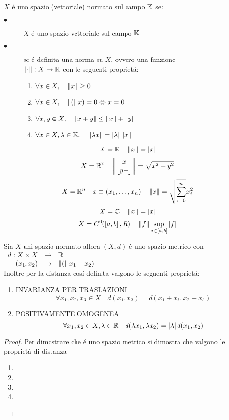 $X$ \'e uno spazio (vettoriale) normato sul campo $\mathbb{K}$ se:
\begin{description}
	\item[$\bullet$] $X$ \'e uno spazio vettoriale sul campo $\mathbb{K}$
	\item[$\bullet$] se \'e definita una norma su $X$, ovvero una funzione\\
	$\left\| \cdot \right\|:X\to\mathbb{R}$ con le seguenti propriet\'a:
	\begin{enumerate}
		\item $\forall x\in X,\quad\left\|x\right\|\ge0$
		\item $\forall x\in X,\quad\left\|(\right\|x)=0\Leftrightarrow x=0$
		\item $\forall x,y\in X,\quad\left\|x+y\right\|\le\left\|x\right\|+\left\|y\right\|$
		\item $\forall x\in X,\lambda\in\mathbb{K},\quad\left\|\lambda x\right\|=\left|\lambda\right|\left\|x\right\|$
	\end{enumerate}
\end{description}

\example
$$X=\mathbb{R}\quad\left\|x\right\|=\left|x\right|$$
\example
$$X=\mathbb{R}^{2}\quad\left\|\left[\begin{matrix}x\\y+\end{matrix}\right]\right\|=\sqrt{x^2+y^2}$$
\example
$$X=\mathbb{R}^{n}\quad x\equiv(x_1,\ldots,x_n)\quad \left\|x\right\|=\sqrt{\sum\limits_{i=0}^n}x_i^2$$
\example
$$X=\mathbb{C}\quad\left\|x\right\|=\left|x\right|$$
\example
$$X=C^0(\left[a,b\right],R)\quad\left\|f\right\|\sup\limits_{x\in\left[a,b\right]}\left|f\right|$$

\proposition
Sia $X$ uni spazio normato allora $(X,d)$ \'e uno spazio metrico con $\begin{array}{rcl} d : X\times X & \to & \mathbb{R} \\ (x_1,x_2) & \to & \left\|(\right\|x_1-x_2) \end{array}$\\
Inoltre per la distanza cos\'i definita valgono le seguenti propriet\'a:
\begin{enumerate}
	\item INVARIANZA PER TRASLAZIONI
	$$\forall x_1,x_2,x_3\in X \quad d(x_1,x_2)=d(x_1+x_3,x_2+x_3)$$
	\item POSITIVAMENTE OMOGENEA
	$$ \forall x_1,x_2\in X, \lambda\in\mathbb{R}\quad d(\lambda x_1,\lambda x_2)=\left|\lambda\right|d(x_1,x_2)$$
\end{enumerate}
\begin{proof}
	Per dimostrare che \'e uno spazio metrico si dimostra che valgono le propriet\'a di distanza
	\begin{enumerate}
		\item
		\item
		\item
		\item
	\end{enumerate}
\end{proof}

